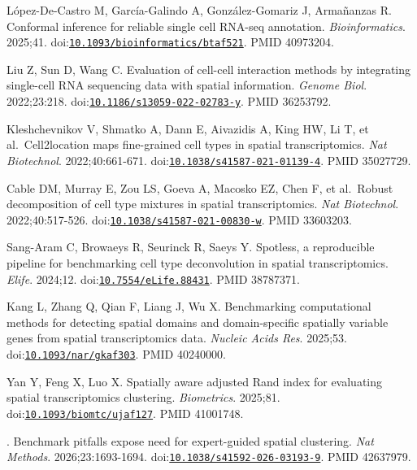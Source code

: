 \documentclass[11pt]{article}
\begin{document}
\begin{enumerate}[label={[\arabic*]},leftmargin=2.6em,labelsep=0.5em,itemsep=1.5pt]
  López-De-Castro M, García-Galindo A, González-Gomariz J, Armañanzas R.
  Conformal inference for reliable single cell RNA-seq annotation.
  \emph{Bioinformatics}. 2025;41.
  doi:\href{https://doi.org/10.1093/bioinformatics/btaf521}{\nolinkurl{10.1093/bioinformatics/btaf521}}.
  PMID 40973204.
\item
  Liu Z, Sun D, Wang C. Evaluation of cell-cell interaction methods by
  integrating single-cell RNA sequencing data with spatial information.
  \emph{Genome Biol}. 2022;23:218.
  doi:\href{https://doi.org/10.1186/s13059-022-02783-y}{\nolinkurl{10.1186/s13059-022-02783-y}}.
  PMID 36253792.
\item
  Kleshchevnikov V, Shmatko A, Dann E, Aivazidis A, King HW, Li T, et
  al.~Cell2location maps fine-grained cell types in spatial
  transcriptomics. \emph{Nat Biotechnol}. 2022;40:661-671.
  doi:\href{https://doi.org/10.1038/s41587-021-01139-4}{\nolinkurl{10.1038/s41587-021-01139-4}}.
  PMID 35027729.
\item
  Cable DM, Murray E, Zou LS, Goeva A, Macosko EZ, Chen F, et al.~Robust
  decomposition of cell type mixtures in spatial transcriptomics.
  \emph{Nat Biotechnol}. 2022;40:517-526.
  doi:\href{https://doi.org/10.1038/s41587-021-00830-w}{\nolinkurl{10.1038/s41587-021-00830-w}}.
  PMID 33603203.
\item
  Sang-Aram C, Browaeys R, Seurinck R, Saeys Y. Spotless, a reproducible
  pipeline for benchmarking cell type deconvolution in spatial
  transcriptomics. \emph{Elife}. 2024;12.
  doi:\href{https://doi.org/10.7554/eLife.88431}{\nolinkurl{10.7554/eLife.88431}}.
  PMID 38787371.
\item
  Kang L, Zhang Q, Qian F, Liang J, Wu X. Benchmarking computational
  methods for detecting spatial domains and domain-specific spatially
  variable genes from spatial transcriptomics data. \emph{Nucleic Acids
  Res}. 2025;53.
  doi:\href{https://doi.org/10.1093/nar/gkaf303}{\nolinkurl{10.1093/nar/gkaf303}}.
  PMID 40240000.
\item
  Yan Y, Feng X, Luo X. Spatially aware adjusted Rand index for
  evaluating spatial transcriptomics clustering. \emph{Biometrics}.
  2025;81.
  doi:\href{https://doi.org/10.1093/biomtc/ujaf127}{\nolinkurl{10.1093/biomtc/ujaf127}}.
  PMID 41001748.
\item
  . Benchmark pitfalls expose need for expert-guided spatial clustering.
  \emph{Nat Methods}. 2026;23:1693-1694.
  doi:\href{https://doi.org/10.1038/s41592-026-03193-9}{\nolinkurl{10.1038/s41592-026-03193-9}}.
  PMID 42637979.
\item

\end{enumerate}
\end{document}
